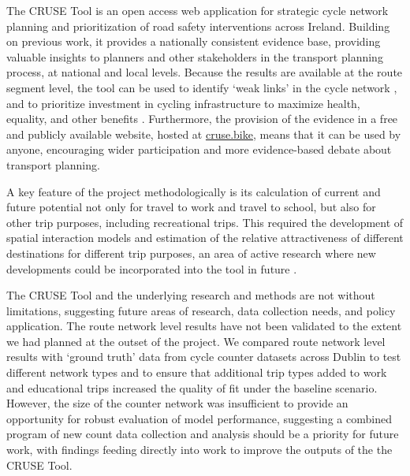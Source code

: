 \documentclass[
  super,
  preprint,
  3p]{elsarticle}
\begin{document}
The CRUSE Tool is an open access web application for strategic cycle
network planning and prioritization of road safety interventions across
Ireland. Building on previous work, it provides a nationally consistent
evidence base, providing valuable insights to planners and other
stakeholders in the transport planning process, at national and local
levels. Because the results are available at the route segment level,
the tool can be used to identify `weak links' in the cycle network
\citep{vybornova2022}, and to prioritize investment in cycling
infrastructure to maximize health, equality, and other benefits
\citep{mahfouz, woodcock2021}. Furthermore, the provision of the
evidence in a free and publicly available website, hosted at
\href{https://cruse.bike}{cruse.bike}, means that it can be used by
anyone, encouraging wider participation and more evidence-based debate
about transport planning.

A key feature of the project methodologically is its calculation of
current and future potential not only for travel to work and travel to
school, but also for other trip purposes, including recreational trips.
This required the development of spatial interaction models and
estimation of the relative attractiveness of different destinations for
different trip purposes, an area of active research where new
developments could be incorporated into the tool in future
\citep{hasova2022}.

The CRUSE Tool and the underlying research and methods are not without
limitations, suggesting future areas of research, data collection needs,
and policy application. The route network level results have not been
validated to the extent we had planned at the outset of the project. We
compared route network level results with `ground truth' data from cycle
counter datasets across Dublin to test different network types and to
ensure that additional trip types added to work and educational trips
increased the quality of fit under the baseline scenario. However, the
size of the counter network was insufficient to provide an opportunity
for robust evaluation of model performance, suggesting a combined
program of new count data collection and analysis should be a priority
for future work, with findings feeding directly into work to improve the
outputs of the the CRUSE Tool.
\end{document}
